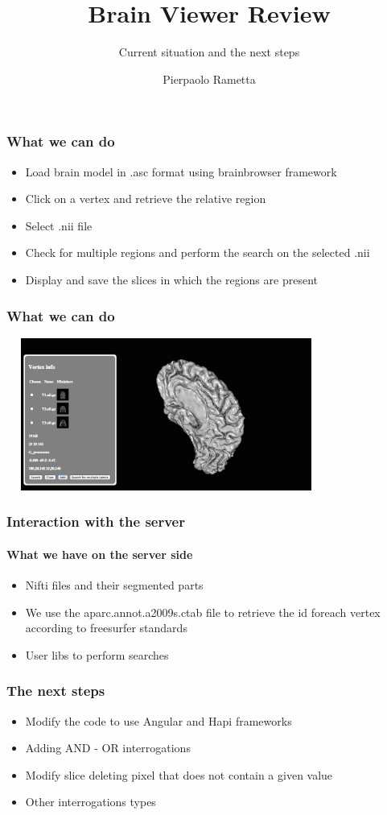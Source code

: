 \documentclass[mathserif,serif]{beamer}
\title
{Brain Viewer Review}
\subtitle{Current situation and the next steps}
\author
{Pierpaolo Rametta}
\begin{document}
  \frame{\titlepage}

  \begin{frame}
    \frametitle{What we can do}
    	\begin{itemize}
    		\item Load brain model in .asc format using brainbrowser framework
    		\item Click on a vertex and retrieve the relative region
    		\item Select .nii file
    		\item Check for multiple regions and perform the search on the selected .nii
    		\item Display and save the slices in which the regions are present
    	\end{itemize} 

  \end{frame}

  \begin{frame}
  	\frametitle{What we can do}

  	\includegraphics[width=10.5cm, height=5cm]{screenshot1}

  \end{frame}

  \begin{frame}
    \frametitle{Interaction with the server}
    \framesubtitle{What we have on the server side}

    	\begin{itemize}
    		\item Nifti files and their segmented parts 
    		\item We use the aparc.annot.a2009s.ctab file to retrieve the id foreach vertex according to freesurfer standards
    		\item User libs to perform searches  
    	\end{itemize}

  \end{frame}

  \begin{frame}
  	\frametitle{The next steps}

  		\begin{itemize}
  			\item Modify the code to use Angular and Hapi frameworks
  			\item Adding AND - OR interrogations
  			\item Modify slice deleting pixel that does not contain a given value
  			\item Other interrogations types
  		\end{itemize}
  \end{frame}
\end{document}
